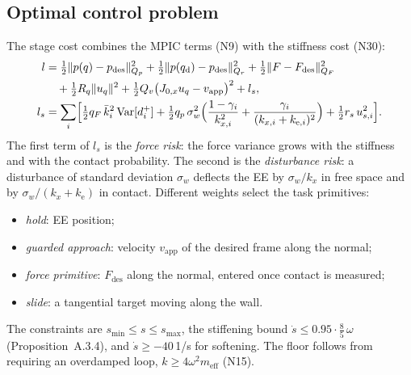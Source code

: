 \documentclass[11pt,a4paper]{article}
\newcommand{\kb}{\bar{k}}
\newcommand{\qd}{q_{\mathrm{d}}}
\newcommand{\ke}{k_{\mathrm{e}}}
\newcommand{\kx}{k_{x}}
\newcommand{\Fdes}{F_{\mathrm{des}}}
\newcommand{\vapp}{v_{\mathrm{app}}}
\begin{document}
\subsection{Optimal control problem}
The stage cost combines the MPIC terms (N9) with the stiffness cost (N30):
\begin{align}
l&=\tfrac12\|p(q)-p_\mathrm{des}\|^2_{Q_p}+\tfrac12\|p(\qd)-p_\mathrm{des}\|^2_{Q_r}+\tfrac12\|F-\Fdes\|^2_{Q_F}\notag\\
&\quad+\tfrac12 R_q\|u_q\|^2+\tfrac12 Q_v\bigl(J_{0,x}u_q-\vapp\bigr)^2+l_s,\\
l_s&=\sum_{i}\Bigl[\tfrac12 q_F\,\kb_i^2\,\mathrm{Var}[d_i^+]+\tfrac12 q_p\,\sigma_w^2\Bigl(\frac{1-\gamma_i}{k_{x,i}^2}+\frac{\gamma_i}{(k_{x,i}+k_{\mathrm{e},i})^2}\Bigr)+\tfrac12 r_s\,u_{s,i}^2\Bigr].\label{eq:ls}
\end{align}
The first term of $l_s$ is the \emph{force risk}: the force variance grows with the stiffness and with
the contact probability. The second is the \emph{disturbance risk}: a disturbance of standard deviation
$\sigma_w$ deflects the EE by $\sigma_w/\kx$ in free space and by $\sigma_w/(\kx+\ke)$ in contact.
Different weights select the task primitives:
\begin{itemize}[leftmargin=14pt]
\item \emph{hold}: EE position;
\item \emph{guarded approach}: velocity $\vapp$ of the desired frame along the normal;
\item \emph{force primitive}: $\Fdes$ along the normal, entered once contact is measured;
\item \emph{slide}: a tangential target moving along the wall.
\end{itemize}
The constraints are $s_\mathrm{min}\le s\le s_\mathrm{max}$, the stiffening bound
$\dot s\le 0.95\cdot\tfrac85\,\omega$ (Proposition~A.3.4), and $\dot s\ge -40$\,1/s for softening. The
floor follows from requiring an overdamped loop, $k\ge4\omega^2m_\mathrm{eff}$ (N15).
\end{document}
